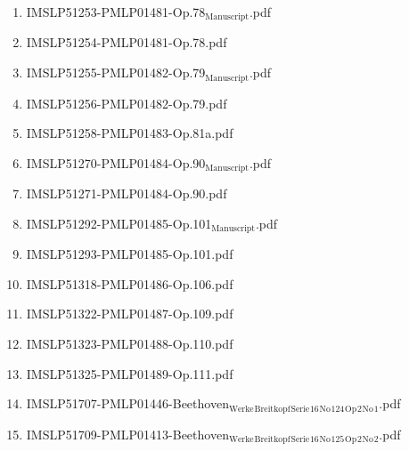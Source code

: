 \documentclass[11pt]{article}
\begin{document}
\begin{enumerate}
\begin{enumerate}
\begin{enumerate}
\item IMSLP51253-PMLP01481-Op.78$_{\text{Manuscript}}$.pdf
\label{sec-1-1-1-1-44-9-6-7-37}

\item IMSLP51254-PMLP01481-Op.78.pdf
\label{sec-1-1-1-1-44-9-6-7-38}

\item IMSLP51255-PMLP01482-Op.79$_{\text{Manuscript}}$.pdf
\label{sec-1-1-1-1-44-9-6-7-39}

\item IMSLP51256-PMLP01482-Op.79.pdf
\label{sec-1-1-1-1-44-9-6-7-40}

\item IMSLP51258-PMLP01483-Op.81a.pdf
\label{sec-1-1-1-1-44-9-6-7-41}

\item IMSLP51270-PMLP01484-Op.90$_{\text{Manuscript}}$.pdf
\label{sec-1-1-1-1-44-9-6-7-42}

\item IMSLP51271-PMLP01484-Op.90.pdf
\label{sec-1-1-1-1-44-9-6-7-43}

\item IMSLP51292-PMLP01485-Op.101$_{\text{Manuscript}}$.pdf
\label{sec-1-1-1-1-44-9-6-7-44}

\item IMSLP51293-PMLP01485-Op.101.pdf
\label{sec-1-1-1-1-44-9-6-7-45}

\item IMSLP51318-PMLP01486-Op.106.pdf
\label{sec-1-1-1-1-44-9-6-7-46}

\item IMSLP51322-PMLP01487-Op.109.pdf
\label{sec-1-1-1-1-44-9-6-7-47}

\item IMSLP51323-PMLP01488-Op.110.pdf
\label{sec-1-1-1-1-44-9-6-7-48}

\item IMSLP51325-PMLP01489-Op.111.pdf
\label{sec-1-1-1-1-44-9-6-7-49}

\item IMSLP51707-PMLP01446-Beethoven$_{\text{Werke}}$$_{\text{Breitkopf}}$$_{\text{Serie}}$$_{\text{16}}$$_{\text{No}}$$_{\text{124}}$$_{\text{Op}}$$_{\text{2}}$$_{\text{No}}$$_{\text{1}}$.pdf
\label{sec-1-1-1-1-44-9-6-7-50}

\item IMSLP51709-PMLP01413-Beethoven$_{\text{Werke}}$$_{\text{Breitkopf}}$$_{\text{Serie}}$$_{\text{16}}$$_{\text{No}}$$_{\text{125}}$$_{\text{Op}}$$_{\text{2}}$$_{\text{No}}$$_{\text{2}}$.pdf
\label{sec-1-1-1-1-44-9-6-7-51}


\end{enumerate}
\end{enumerate}
\end{enumerate}
\end{document}
